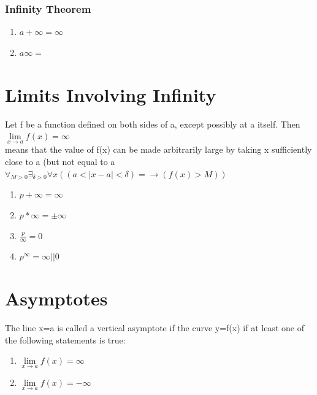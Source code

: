 \documentclass{article}
\begin{document}
 
 
 
\subsubsection{Infinity Theorem}
\begin{enumerate}
	\item $a + \infty = \infty$
	\item $a\infty =$
\end{enumerate}
 
 
 \section{Limits Involving Infinity}
 Let f be a function defined on both sides of a, except possibly at a itself. Then $\lim\limits_{x\to a} f(x) = \infty$ \\
 means that the value of f(x) can be made arbitrarily large by taking x sufficiently close to a (but not equal to a \\
 $\forall_{M>0} \exists_{ \delta>0} \forall x ((a < |x-a| < \delta) = \rightarrow (f(x) > M))$ 
 
\begin{enumerate}
	\item $p+\infty = \infty$
	\item $p*\infty = \pm\infty$
	\item $\frac{p}{\infty} = 0$
	\item $p^\infty = \infty || 0$
\end{enumerate}


\section{Asymptotes}
The line x=a is called a vertical asymptote if the curve y=f(x) if at least one of the following statements is true:
\begin{enumerate}
	\item $\lim\limits_{x\to a} f(x) = \infty$
	\item $\lim\limits_{x\to a} f(x) = -\infty$
\end{enumerate}

 
 
 
 
 
 
 
 
 
 
 
 
 
 
 
\end{document}
